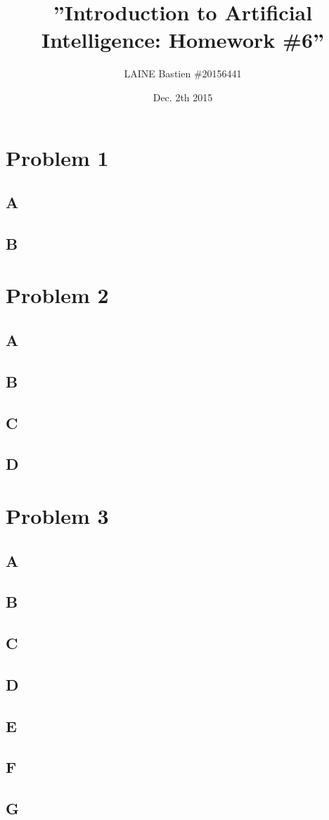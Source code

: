 \documentclass{article}
\begin{document}
\title{\textbf{''Introduction to Artificial Intelligence: Homework \#6''}}
\author{LAINE Bastien \#20156441}
\date{Dec. 2th 2015}
\maketitle
\tableofcontents

\newpage
    \section{Problem 1}
        \subsection{A}
        \subsection{B}
    \section{Problem 2}
        \subsection{A}
        \subsection{B}
        \subsection{C}
        \subsection{D}
    \section{Problem 3}
        \subsection{A}
        \subsection{B}
        \subsection{C}
        \subsection{D}
        \subsection{E}
        \subsection{F}
        \subsection{G}
\end{document}
